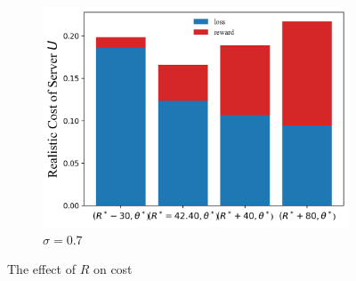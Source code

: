 \documentclass{article}
\theoremstyle{plain}
\theoremstyle{definition}
\theoremstyle{remark}
\begin{document}
\begin{figure}
\begin{subfigure}{0.31\textwidth}
		\includegraphics[width=\textwidth]{figures/figure_75_C.png}
    \caption{$\sigma=0.7$}
	\end{subfigure}
	\caption{The effect of $R$ on cost}
\end{figure}
\end{document}
